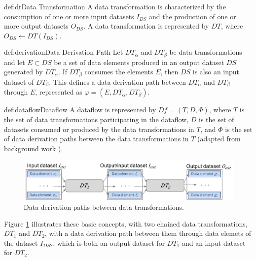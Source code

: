 \begin{mydef}{def:dt}{Data Transformation}
A data transformation is characterized by the consumption of one or more input datasets $I_{DS}$ and the production of one or more output datasets $O_{DS}$.
A data transformation is represented by $DT$, where $O_{DS} \leftarrow DT(I_{DS})$.
\end{mydef}

\begin{mydef}{def:derivation}{Data Derivation Path}
Let $DT_\alpha$ and $DT_\beta$ be data transformations and let $E \subset DS$ be a set of data elements produced in an output dataset $DS$ generated by $DT_\alpha$. If $DT_\beta$  consumes the elements $E$, then $DS$ is also an input dataset of $DT_\beta$. This defines a data derivation path between $DT_\alpha$ and $DT_\beta$ through
$E$, represented as $\varphi=(E,DT_\alpha,DT_\beta)$.
\end{mydef}

\begin{mydef}{def:dataflow}{Dataflow}
A dataflow is represented by $Df=(T,D,\Phi)$, where $T$ is the set of data transformations participating in the dataflow, $D$ is the set of datasets consumed or produced by the data transformations in $T$, and $\Phi$ is the set of data derivation paths between the data transformations in $T$ (adapted from background work \cite{souza_keeping_2019, Silva2017Raw, Ikeda2013Logical}).
\end{mydef}

\begin{figure}[H]
    \centering
    \includegraphics[width=\textwidth,keepaspectratio]{img/dataflow-example.pdf}
    \caption{Data derivation paths between data transformations.}
    \label{fig:derivation_paths}
\end{figure}

\noindent Figure \ref{fig:derivation_paths} illustrates these basic concepts, with two chained data transformations, $DT_1$ and $DT_2$, with a data derivation path between them through data elemets of the dataset $I_{DS2}$, which is both an output dataset for $DT_1$ and an input dataset for $DT_2$.

